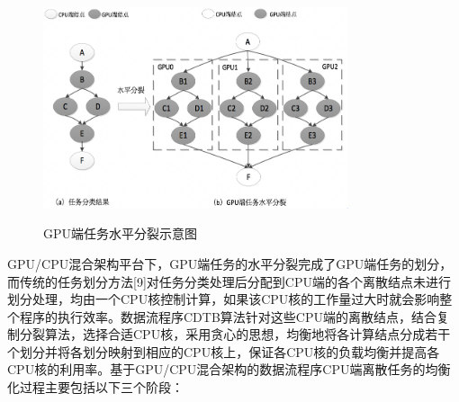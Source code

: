 \begin{figure}[htbp]
  \centering
  \includegraphics[width=0.8\textwidth]{Img/Chap_Application/Yu/3-1.png}\\
  \caption{GPU端任务水平分裂示意图}\label{fig:3.1}
\end{figure}


GPU/CPU混合架构平台下，GPU端任务的水平分裂完成了GPU端任务的划分，而传统的任务划分方法[9]对任务分类处理后分配到CPU端的各个离散结点未进行划分处理，均由一个CPU核控制计算，如果该CPU核的工作量过大时就会影响整个程序的执行效率。数据流程序CDTB算法针对这些CPU端的离散结点，结合复制分裂算法，选择合适CPU核，采用贪心的思想，均衡地将各计算结点分成若干个划分并将各划分映射到相应的CPU核上，保证各CPU核的负载均衡并提高各CPU核的利用率。基于GPU/CPU混合架构的数据流程序CPU端离散任务的均衡化过程主要包括以下三个阶段：


